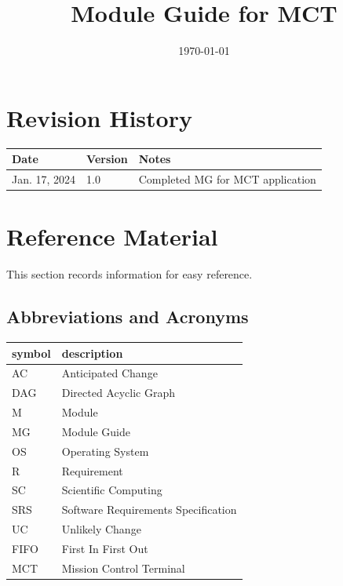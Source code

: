 \documentclass[12pt, titlepage]{article}
\begin{document}
\title{Module Guide for MCT }
\author{\authname}
\date{\today}

\maketitle


\section{Revision History}

\begin{tabularx}{\textwidth}{p{3cm}p{2cm}X}
\toprule {\bf Date} & {\bf Version} & {\bf Notes}\\
\midrule
Jan. 17, 2024 & 1.0 & Completed MG for MCT application\\
\bottomrule
\end{tabularx}

\newpage

\section{Reference Material}

This section records information for easy reference.

\subsection{Abbreviations and Acronyms}

\renewcommand{\arraystretch}{1.2}
\begin{tabular}{l l} 
  \toprule		
  \textbf{symbol} & \textbf{description}\\
  \midrule 
  AC & Anticipated Change\\
  DAG & Directed Acyclic Graph \\
  M & Module \\
  MG & Module Guide \\
  OS & Operating System \\
  R & Requirement\\
  SC & Scientific Computing \\
  SRS & Software Requirements Specification\\
  UC & Unlikely Change \\
  FIFO & First In First Out \\
  MCT & Mission Control Terminal\\
  \bottomrule
\end{tabular}\\
\end{document}
